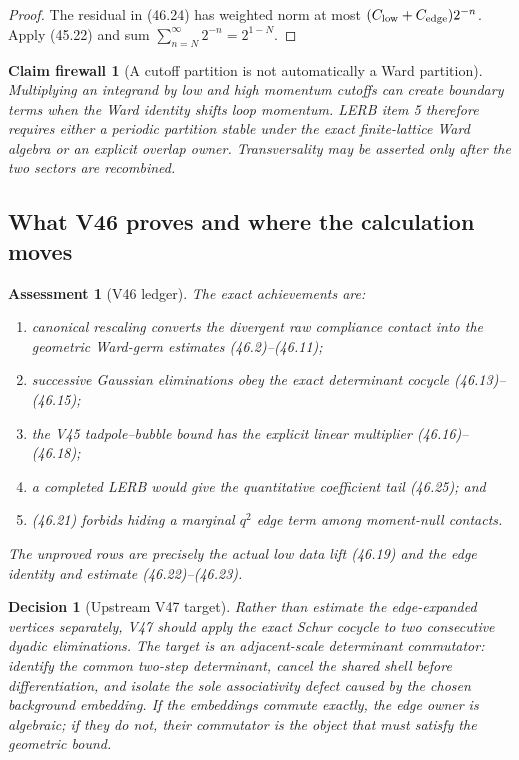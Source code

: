 \documentclass[11pt,oneside]{book}
\newtheorem{assessment}[theorem]{Assessment}
\newtheorem{firewall}[theorem]{Claim firewall}
\newtheorem{decision}[theorem]{Decision}
\theoremstyle{definition}
\theoremstyle{remark}
\begin{document}
\begin{proof}
The residual in (46.24) has weighted norm at most
\((C_{\rm low}+C_{\rm edge})2^{-n}\).  Apply (45.22) and sum
\(\sum_{n=N}^\infty2^{-n}=2^{1-N}\).
\end{proof}

\begin{firewall}[A cutoff partition is not automatically a Ward
partition]
\label{fire:e8v46-cutoff-Ward}
Multiplying an integrand by low and high momentum cutoffs can create
boundary terms when the Ward identity shifts loop momentum.
LERB item 5 therefore requires either a periodic partition stable
under the exact finite-lattice Ward algebra or an explicit overlap
owner.  Transversality may be asserted only after the two sectors
are recombined.
\end{firewall}

\subsection{What V46 proves and where the calculation moves}

\begin{assessment}[V46 ledger]
\label{ass:e8v46-ledger}
The exact achievements are:
\begin{enumerate}
\item canonical rescaling converts the divergent raw compliance
      contact into the geometric Ward-germ estimates
      (46.2)--(46.11);
\item successive Gaussian eliminations obey the exact determinant
      cocycle (46.13)--(46.15);
\item the V45 tadpole--bubble bound has the explicit linear
      multiplier (46.16)--(46.18);
\item a completed LERB would give the quantitative coefficient tail
      (46.25); and
\item (46.21) forbids hiding a marginal \(q^2\) edge term among
      moment-null contacts.
\end{enumerate}
The unproved rows are precisely the actual low data lift (46.19)
and the edge identity and estimate (46.22)--(46.23).
\end{assessment}

\begin{decision}[Upstream V47 target]
\label{dec:e8v46-next}
Rather than estimate the edge-expanded vertices separately, V47
should apply the exact Schur cocycle to two consecutive dyadic
eliminations.  The target is an adjacent-scale determinant
commutator: identify the common two-step determinant, cancel the
shared shell before differentiation, and isolate the sole
associativity defect caused by the chosen background embedding.
If the embeddings commute exactly, the edge owner is algebraic; if
they do not, their commutator is the object that must satisfy the
geometric bound.
\end{decision}
\end{document}
